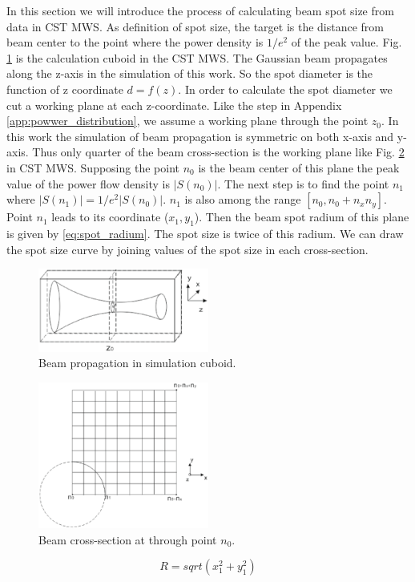 In this section we will introduce the process of calculating beam spot size from data in CST MWS. As definition of spot size, the target is the distance from beam center to the point where the power density is $1/e^{2}$ of the peak value.  Fig. \ref{Afig:beam_cuboid} is the calculation cuboid in the CST MWS. The Gaussian beam propagates along the z-axis in the simulation of this work. So the spot diameter is the function of z coordinate $d=f(z)$. In order to calculate the spot diameter we cut a working plane at each z-coordinate. Like the step in Appendix \ref{app:powwer_distribution}, we assume a working plane through the point $z_{0}$. In this work the simulation of beam propagation is symmetric on both x-axis and y-axis. Thus only quarter of the beam cross-section is the working plane like Fig. \ref{Afig:beam_crosssection} in CST MWS. Supposing the point $n_{0}$ is the beam center of this plane the peak value of the power flow density is $|S(n_{0})|$. The next step is to find the point $n_{1}$ where $|S(n_{1})|=1/e^{2}|S(n_{0})|$. $n_{1}$ is also among the range $[n_{0}, n_{0}+n_{x}n_{y}]$. Point $n_{1}$ leads to its coordinate ($x_{1},y_{1}$). Then the beam spot radium of this plane is given by \ref{eq:spot_radium}. The spot size is twice of this radium. We can draw the spot size curve by joining values of the spot size in each cross-section.
\begin{figure}[!ht]
\centering
\includegraphics[width=0.5\textwidth]{bilder/beam_cuboid}
\caption{Beam propagation in simulation cuboid.}
\label{Afig:beam_cuboid}
\end{figure}
\begin{figure}[!ht]
\centering
\includegraphics[width=0.5\textwidth]{bilder/beam_crosssection}
\caption{Beam cross-section at through point $n_{0}$.}
\label{Afig:beam_crosssection}
\end{figure}
\begin{equation}
R=sqrt(x_{1}^{2}+y_{1}^{2})
\label{eq:spot_radium}
\end{equation} 
